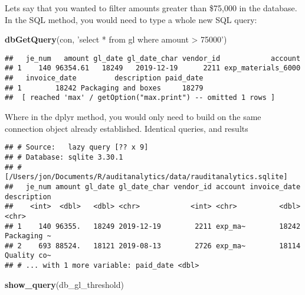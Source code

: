 \documentclass[
]{book}
\newenvironment{Shaded}{\begin{snugshade}}{\end{snugshade}}
\newcommand{\DecValTok}[1]{\textcolor[rgb]{0.00,0.00,0.81}{#1}}
\newcommand{\KeywordTok}[1]{\textcolor[rgb]{0.13,0.29,0.53}{\textbf{#1}}}
\newcommand{\NormalTok}[1]{#1}
\newcommand{\OperatorTok}[1]{\textcolor[rgb]{0.81,0.36,0.00}{\textbf{#1}}}
\newcommand{\StringTok}[1]{\textcolor[rgb]{0.31,0.60,0.02}{#1}}
\begin{document}
Lets say that you wanted to filter amounts greater than \$75,000 in the database. In the SQL method, you would need to type a whole new SQL query:

\begin{Shaded}
\begin{Highlighting}[]
\KeywordTok{dbGetQuery}\NormalTok{(con, }\StringTok{'select * from gl where amount > 75000'}\NormalTok{)}
\end{Highlighting}
\end{Shaded}

\begin{verbatim}
##   je_num   amount gl_date gl_date_char vendor_id            account
## 1    140 96354.61   18249   2019-12-19      2211 exp_materials_6000
##   invoice_date         description paid_date
## 1        18242 Packaging and boxes     18279
##  [ reached 'max' / getOption("max.print") -- omitted 1 rows ]
\end{verbatim}

Where in the dplyr method, you would only need to build on the same connection object already established. Identical queries, and results

\begin{Shaded}
\end{Shaded}

\begin{verbatim}
## # Source:   lazy query [?? x 9]
## # Database: sqlite 3.30.1
## #   [/Users/jon/Documents/R/auditanalytics/data/rauditanalytics.sqlite]
##   je_num amount gl_date gl_date_char vendor_id account invoice_date description
##    <int>  <dbl>   <dbl> <chr>            <int> <chr>          <dbl> <chr>      
## 1    140 96355.   18249 2019-12-19        2211 exp_ma~        18242 Packaging ~
## 2    693 88524.   18121 2019-08-13        2726 exp_ma~        18114 Quality co~
## # ... with 1 more variable: paid_date <dbl>
\end{verbatim}

\begin{Shaded}
\begin{Highlighting}[]
\KeywordTok{show_query}\NormalTok{(db_gl_threshold)}
\end{Highlighting}
\end{Shaded}
\end{document}
